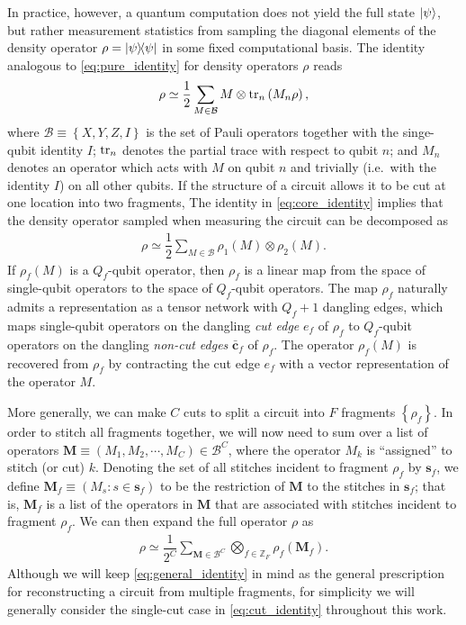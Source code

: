 \documentclass[nofootinbib,notitlepage,11pt]{revtex4-2}
\newcommand{\f}[2]{\dfrac{#1}{#2}} %
\newcommand{\p}[1]{\left(#1\right)} %
\renewcommand{\set}[1]{\left\{#1\right\}} %
\renewcommand{\v}{\bm} %
\newcommand{\B}{\mathcal{B}}
\newcommand{\Z}{\mathbb{Z}}
\begin{document}
In practice, however, a quantum computation does not yield the full
state $\ket\psi$, but rather measurement statistics from sampling the
diagonal elements of the density operator $\rho=\op\psi$ in some fixed
computational basis.  The identity analogous to
\eqref{eq:pure_identity} for density operators $\rho$ reads
\begin{align}
  \rho \simeq \f12 \sum_{M\in\B} M \otimes \tr_n\p{M_n\rho},
  \label{eq:core_identity}
\end{align}
where $\B\equiv\set{X,Y,Z,I}$ is the set of Pauli operators together
with the singe-qubit identity $I$; $\tr_n$ denotes the partial trace
with respect to qubit $n$; and $M_n$ denotes an operator which acts
with $M$ on qubit $n$ and trivially (i.e.~with the identity $I$) on
all other qubits.  If the structure of a circuit allows it to be cut
at one location into two fragments, The identity in
\eqref{eq:core_identity} implies that the density operator sampled
when measuring the circuit can be decomposed as
\begin{align}
  \rho \simeq \f12 \sum_{M\in\B} \rho_1\p{M} \otimes \rho_2\p{M}.
  \label{eq:cut_identity}
\end{align}
If $\rho_f\p{M}$ is a $Q_f$-qubit operator, then $\rho_f$ is a linear
map from the space of single-qubit operators to the space of
$Q_f$-qubit operators.  The map $\rho_f$ naturally admits a
representation as a tensor network with $Q_f+1$ dangling edges, which
maps single-qubit operators on the dangling {\it cut edge} $e_f$ of
$\rho_f$ to $Q_f$-qubit operators on the dangling {\it non-cut edges}
$\bar{\v c}_f$ of $\rho_f$.  The operator $\rho_f\p{M}$ is recovered
from $\rho_f$ by contracting the cut edge $e_f$ with a vector
representation of the operator $M$.

More generally, we can make $C$ cuts to split a circuit into $F$
fragments $\set{\rho_f}$.  In order to stitch all fragments together,
we will now need to sum over a list of operators
$\v M\equiv\p{M_1,M_2,\cdots,M_C}\in\B^C$, where the operator $M_k$ is
``assigned'' to stitch (or cut) $k$.  Denoting the set of all stitches
incident to fragment $\rho_f$ by $\v s_f$, we define
$\v M_f\equiv\p{M_s:s\in\v s_f}$ to be the restriction of $\v M$ to
the stitches in $\v s_f$; that is, $\v M_f$ is a list of the operators
in $\v M$ that are associated with stitches incident to fragment
$\rho_f$.  We can then expand the full operator $\rho$ as
\begin{align}
  \rho \simeq \f1{2^C} \sum_{\v M\in\B^C}
  \bigotimes_{f\in\Z_F} \rho_f\p{\v M_f}.
  \label{eq:general_identity}
\end{align}
Although we will keep \eqref{eq:general_identity} in mind as the
general prescription for reconstructing a circuit from multiple
fragments, for simplicity we will generally consider the single-cut
case in \eqref{eq:cut_identity} throughout this work.
\end{document}
